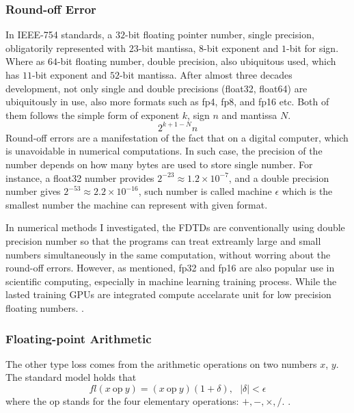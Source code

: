 \subsubsection{Round-off Error}
In IEEE-754 \cite{IEEE_754} standards, a $32$-bit floating pointer number, single precision, obligatorily represented with $23$-bit mantissa, 
$8$-bit exponent and $1$-bit for sign. 
Where as $64$-bit floating number, double precision, also ubiquitous used, which has $11$-bit exponent and $52$-bit mantissa.
After almost three decades development, not only single and double precisions (float32, float64) are ubiquitously in use, 
also more formats such as fp4, fp8, and fp16 etc. Both of them follows the simple form of exponent $k$, sign $n$ and mantissa $N$. 
\cite{IEEE_754_p2_eq1}
\begin{equation*}
  2^{k+1-N}n
\end{equation*}
Round-off errors are a manifestation of the fact that on a digital computer, which is unavoidable in numerical computations.
In such case, the precision of the number depends on how many bytes are used to store single number. 
For instance, a float32 number provides $2^{-23} \approx 1.2\times10^{-7}$, and a double precision number gives $2^{-53} \approx 2.2\times10^{-16}$, 
such number is called machine $\epsilon$ which is the smallest number the machine can represent with given format.

In numerical methods I investigated, the FDTDs are conventionally using double precision number so that the programs can treat extreamly large and small 
numbers simultaneously in the same computation, without worring about the round-off errors.
However, as mentioned, fp32 and fp16 are also popular use in scientific computing, especially in machine learning training process. 
While the lasted training GPUs are integrated compute accelarate unit for low precision floating numbers. \cite{NVIDIA_HB200_PAPER}.

\subsubsection{Floating-point Arithmetic}
The other type loss comes from the arithmetic operations on two numbers $x$, $y$. 
The standard model holds that 
\begin{equation}
  fl(x \:\text{op}\: y) = (x \: \text{op} \: y) (1+\delta), \:\:\: \left|\delta\right| < \epsilon
\end{equation}
where the op stands for the four elementary operations: $+, -, \times, /$. \cite{Germund,NMSC,V1,P112}.
